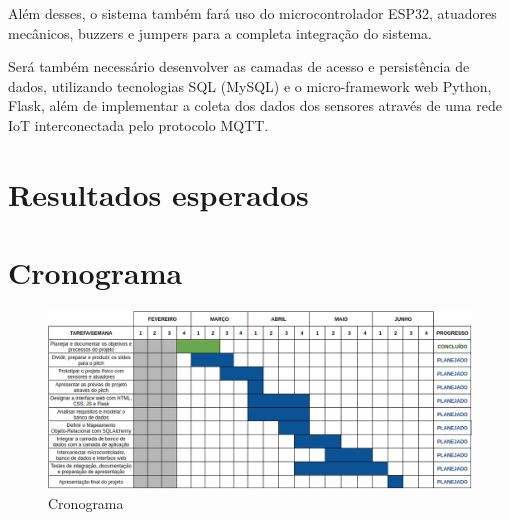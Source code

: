 \documentclass[11pt]{article}
\begin{document}
Além desses, o sistema também fará uso do microcontrolador ESP32, atuadores mecânicos, buzzers e jumpers para a completa integração do sistema.

Será também necessário desenvolver as camadas de acesso e persistência de dados, utilizando tecnologias SQL (MySQL) e o micro-framework web Python, Flask, além de implementar a coleta dos dados dos sensores através de uma rede IoT interconectada pelo protocolo MQTT.

\section{Resultados esperados}

\section{Cronograma}
\begin{figure}[H]
    \centering
    \includegraphics[width=0.9\linewidth]{cronograma.png}
    \caption{Cronograma}
\end{figure}



\end{document}
